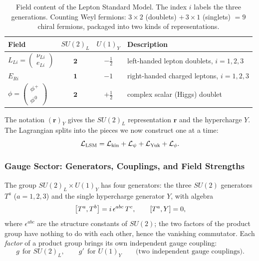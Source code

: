 \begin{table}[ht]
\centering
\begin{tabular}{lccl}
\toprule
Field & $SU(2)_L$ & $U(1)_Y$ & Description \\
\midrule
$L_{Li}=\begin{pmatrix}\nu_{Li}\\ e_{Li}\end{pmatrix}$ & $\mathbf{2}$ & $-\tfrac12$ & left-handed lepton doublets, $i=1,2,3$ \\[6pt]
$E_{Ri}$ & $\mathbf{1}$ & $-1$ & right-handed charged leptons, $i=1,2,3$ \\[2pt]
$\phi=\begin{pmatrix}\phi^+\\ \phi^0\end{pmatrix}$ & $\mathbf{2}$ & $+\tfrac12$ & complex scalar (Higgs) doublet \\
\bottomrule
\end{tabular}
\caption{Field content of the Lepton Standard Model. The index $i$ labels the three generations. Counting Weyl fermions: $3\times2$ (doublets) $+\,3\times1$ (singlets) $=9$ chiral fermions, packaged into two kinds of representations.}
\label{tab:lec17:lsm-content}
\end{table}

The notation $(\mathbf{r})_Y$ gives the $SU(2)_L$ representation $\mathbf{r}$ and the hypercharge $Y$. The Lagrangian splits into the pieces we now construct one at a time:
\begin{equation}
  \mathcal{L}_{\rm LSM}=\mathcal{L}_{\rm kin}+\mathcal{L}_\psi+\mathcal{L}_{\rm Yuk}+\mathcal{L}_\phi .
  \label{eq:lec17:lagrangian_pieces}
\end{equation}

\subsubsection*{Gauge Sector: Generators, Couplings, and Field Strengths}

The group $SU(2)_L\times U(1)_Y$ has four generators: the three $SU(2)$ generators $T^a$ ($a=1,2,3$) and the single hypercharge generator $Y$, with algebra
\begin{equation}
  \comm{T^a}{T^b}=i\,\epsilon^{abc}\,T^c ,
  \qquad
  \comm{T^a}{Y}=0 ,
  \label{eq:lec17:algebra}
\end{equation}
where $\epsilon^{abc}$ are the structure constants of $SU(2)$; the two factors of the product group have nothing to do with each other, hence the vanishing commutator. Each \emph{factor} of a product group brings its own independent gauge coupling:
\begin{equation}
  \boxed{\;g\ \ \text{for } SU(2)_L,
  \qquad
  g'\ \ \text{for } U(1)_Y
  \qquad\text{(two independent gauge couplings).}\;}
  \label{eq:lec17:two_couplings}
\end{equation}

